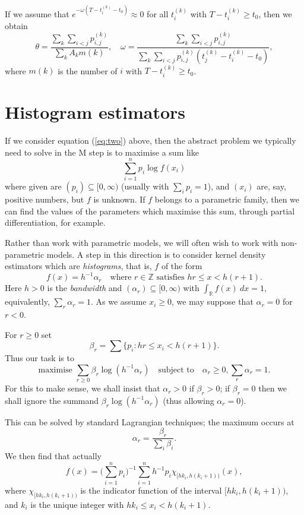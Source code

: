 \documentclass[twoside,a4paper]{article}
\theoremstyle{plain}
\theoremstyle{definition}
\begin{document}
If we assume that $e^{-\omega(T-t^{(k)}_i-t_0)} \approx 0$ for all $t^{(k)}_i$
with $T - t^{(k)}_i \geq t_0$, then we obtain
\[ \theta = \frac{\sum_k \sum_{i<j} p^{(k)}_{i,j}}
{\sum_k A_k m(k)},
\quad
\omega = \frac{\sum_k \sum_{i<j} p^{(k)}_{i,j}}
{\sum_k \sum_{i<j} p^{(k)}_{i,j}(t^{(k)}_j - t^{(k)}_i - t_0)}, \]
where $m(k)$ is the number of $i$ with $T - t^{(k)}_i \geq t_0$.



\section{Histogram estimators}\label{sec:his_est}

If we consider equation (\ref{eq:two}) above, then the abstract problem we typically
need to solve in the M step is to maximise a sum like
\[ \sum_{i=1}^n p_i \log f(x_i) \]
where given are $(p_i) \subseteq [0,\infty)$
(usually with $\sum_i p_i=1$), and $(x_i)$ are, say,
positive numbers, but $f$ is unknown.  If $f$ belongs to a parametric family, then
we can find the values of the parameters which maximise this sum, through partial
differentiation, for example.

Rather than work with parametric models, we will often wish to work with non-parametric
models.  A step in this direction is to consider kernel density estimators which are
\emph{histograms}, that is, $f$ of the form
\[ f(x) = h^{-1}\alpha_r \quad\text{where }r\in\mathbb Z
\text{ satisfies } hr \leq x < h(r+1). \]
Here $h>0$ is the \emph{bandwidth} and $(\alpha_r) \subseteq [0,\infty)$ with
$\int_{\mathbb R} f(x) \ dx = 1$, equivalently, $\sum_r \alpha_r = 1$.
As we assume $x_i\geq 0$, we may suppose that $\alpha_r=0$ for $r<0$.

For $r\geq 0$ set
\[ \beta_r = \sum \big\{ p_i : hr \leq x_i < h(r+1) \big\}. \]
Thus our task is to
\[ \text{maximise } \sum_{r\geq 0} \beta_r \log(h^{-1}\alpha_r)
\quad\text{subject to}\quad
\alpha_r \geq 0, \sum_r \alpha_r = 1. \]
For this to make sense, we shall insist that $\alpha_r > 0$ if $\beta_r> 0 $; if $\beta_r=0$
then we shall ignore the summand $\beta_r \log(h^{-1}\alpha_r)$ (thus allowing $\alpha_r=0$).

This can be solved by standard Lagrangian techniques; the maximum occurs at
\begin{equation}
\alpha_r = \frac{\beta_r}{\sum_i \beta_i}. \label{eq:three}
\end{equation}
We then find that actually
\[ f(x) = \Big(\sum_{i=1}^n p_i\Big)^{-1}
\sum_{i=1}^n h^{-1} p_i \chi_{[hk_i,h(k_i+1))}(x), \]
where $\chi_{[hk_i,h(k_i+1))}$ is the indicator function of the interval
$[hk_i,h(k_i+1))$, and $k_i$ is the unique integer with $hk_i \leq x_i < h(k_i+1)$.
\end{document}

